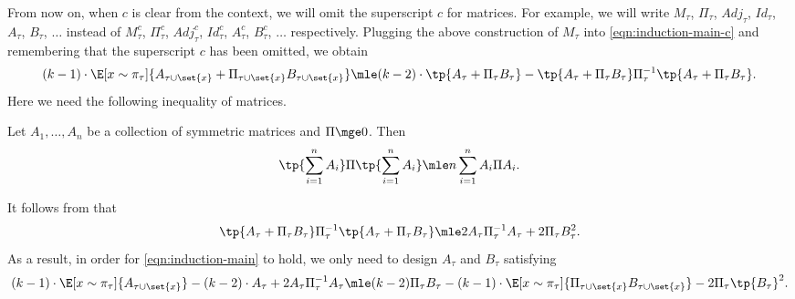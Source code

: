 \documentclass[a4paper,11pt]{article}
\begin{document}
From now on, when $c$ is clear from the context, we will omit the superscript $c$ for matrices.
For example, we will write $M_\tau$, $\Pi_\tau$, $\!{Adj}_\tau$, $\!{Id}_\tau$, $A_\tau$, $B_\tau$, $\dots$ instead of
                           $M^c_\tau$, $\Pi^c_\tau$, $\!{Adj}_\tau^{c}$, $\!{Id}_\tau^{c}$, $A_\tau^c$, $B_\tau^c$, $\dots$ respectively.
Plugging the above construction of $M_\tau$ into \eqref{eqn:induction-main-c} and remembering that the superscript $c$ has been omitted, we obtain
 \[
 (k-1)\cdot\E[x\sim\pi_\tau]{A_{\tau\cup\set{x}}+\Pi_{\tau\cup\set{x}}B_{\tau\cup\set{x}}} \mle (k-2)\cdot\tp{A_\tau+\Pi_\tau B_\tau} -\tp{A_\tau+\Pi_\tau B_\tau}\Pi_\tau^{-1}\tp{A_\tau+\Pi_\tau B_\tau}.
 \]
Here we need the following inequality of matrices.
\begin{lemma}
	\label{lem:matrix-squared-sum}
Let $A_1,\dots,A_n$ be a collection of symmetric matrices and $\Pi\mge 0$. Then
\[
	\tp{\sum_{i=1}^n A_i}\Pi \tp{\sum_{i=1}^n A_i} \mle n\sum_{i=1}^n A_i\Pi A_i.
\]	
\end{lemma}
 It follows from  that
 \[
 \tp{A_\tau+\Pi_\tau B_\tau}\Pi_\tau^{-1}\tp{A_\tau+\Pi_\tau B_\tau}\mle 2A_\tau\Pi_\tau^{-1}A_\tau + 2\Pi_\tau B_\tau^2.
 \]
 As a result, in order for \eqref{eqn:induction-main} to hold, we only need to design $A_\tau$ and $B_\tau$  satisfying
\begin{equation}\label{eqn:condition-main}
 	(k-1)\cdot \E[x\sim\pi_\tau]{A_{\tau\cup\set{x}}} - (k-2) \cdot A_\tau+2A_\tau \Pi_\tau^{-1} A_\tau  \mle (k-2)\Pi_\tau B_\tau -(k-1)\cdot \E[x\sim\pi_\tau]{\Pi_{\tau\cup\set{x}} B_{\tau\cup\set{x}}}-2\Pi_\tau\tp{B_\tau}^2.
\end{equation}
\end{document}
